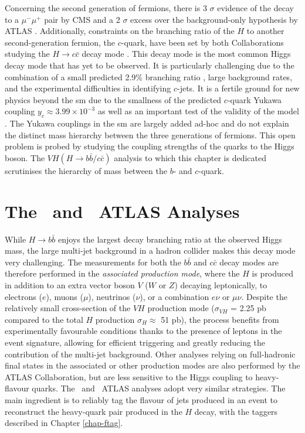 Concerning the second generation of fermions, there is 3 $\sigma$ evidence of the decay to a $\mu^-\mu^+$ pair by CMS \cite{CMS:2020xwi} and a 2 $\sigma$ excess over the background-only hypothesis by ATLAS \cite{ATLAS:2020fzp}. Additionally, constraints on the branching ratio of the $H$ to another second-generation fermion, the $c$-quark, have been set by both Collaborations studying the $H \rightarrow c\bar{c}$ decay mode \cite{Aaboud:2018fhh}. This decay mode is the most common Higgs decay mode that has yet to be observed. It is particularly challenging due to the combination of a small predicted 2.9\% branching ratio \cite{DJOUADI199856}, large background rates, and the experimental difficulties in identifying $c$-jets. It is a fertile ground for new physics beyond the \gls{sm} due to the smallness of the predicted $c$-quark Yukawa coupling $y_c \approx 3.99 \times 10^{-3} $ \cite{yukawac} as well as an important test of the validity of the model \cite{PhysRevD.89.033014,PhysRevD.92.033016,Botella:2016krk,PhysRevD.98.055001,GHOSH2016504,PhysRevLett.123.031802,PhysRevD.100.115041}. The Yukawa couplings in the \gls{sm} are largely added ad-hoc and do not explain the distinct mass hierarchy between the three generations of fermions. This open problem is probed by studying the coupling strengths of the quarks to the Higgs boson. The $VH (H \rightarrow b\bar{b}/c\bar{c})$ analysis to which this chapter is dedicated scrutinises the hierarchy of mass between the $b$- and $c$-quark.

\section[The \vhb\ and \vhc\ ATLAS Analyses]{The \boldvhb\ and \boldvhc\ ATLAS Analyses}
While $H \rightarrow b\bar{b}$ enjoys the largest decay branching ratio at the observed Higgs mass, the large multi-jet background in a hadron collider makes this decay mode very challenging. The measurements for both the $b\bar{b}$ and $c\bar{c}$ decay modes are therefore performed in the \textit{associated production mode}, where the $H$ is produced in addition to an extra vector boson $V$ ($W$ or $Z$) decaying leptonically, to electrons ($e$), muons ($\mu$), neutrinos ($\nu$), or a combination $e\nu$ or $\mu\nu$. Despite the relatively small cross-section of the $VH$ production mode ($\sigma_{VH}$ = 2.25 pb compared to the total $H$ production $\sigma_H \approx$ 51 pb), the process benefits from experimentally favourable conditions thanks to the presence of leptons in the event signature, allowing for efficient triggering and greatly reducing the contribution of the multi-jet background. Other analyses relying on full-hadronic final states in the associated or other production modes are also performed by the ATLAS Collaboration, but are less sensitive to the Higgs coupling to heavy-flavour quarks. The \vhb\ and \vhc\ ATLAS analyses adopt very similar strategies. The main ingredient is to reliably tag the flavour of jets produced in an event to reconstruct the heavy-quark pair produced in the $H$ decay, with the taggers described in Chapter \ref{chap-ftag}. \\ 

